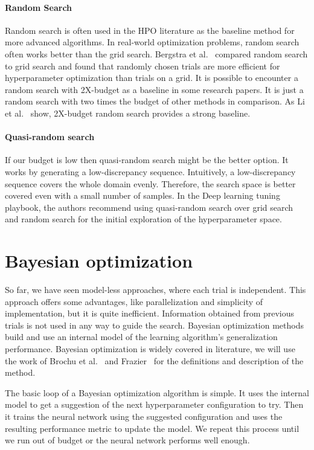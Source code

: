 \paragraph{Random Search} Random search is often used in the HPO literature as the baseline method for more advanced algorithms. In real-world optimization problems, random search often works better than the grid search. Bergstra et al.~\cite{bergstra2012random} compared random search to grid search and found that randomly chosen trials are more efficient for hyperparameter optimization than trials on a grid. It is possible to encounter a random search with 2X-budget as a baseline in some research papers. It is just a random search with two times the budget of other methods in comparison. As Li et al.~\cite{li2018hyperband} show, 2X-budget random search provides a strong baseline.

\paragraph{Quasi-random search} If our budget is low then quasi-random search might be the better option. It works by generating a low-discrepancy sequence. Intuitively, a low-discrepancy sequence covers the whole domain evenly. Therefore, the search space is better covered even with a small number of samples. In the Deep learning tuning playbook, the authors recommend using quasi-random search over grid search and random search for the initial exploration of the hyperparameter space.



\section{Bayesian optimization}
So far, we have seen model-less approaches, where each trial is independent. This approach offers some advantages, like parallelization and simplicity of implementation, but it is quite inefficient. Information obtained from previous trials is not used in any way to guide the search. Bayesian optimization methods build and use an internal model of the learning algorithm's generalization performance. Bayesian optimization is widely covered in literature, we will use the work of Brochu et al.~\cite{brochu2010tutorial} and Frazier~\cite{frazier2018tutorial} for the definitions and description of the method.

The basic loop of a Bayesian optimization algorithm is simple. It uses the internal model to get a suggestion of the next hyperparameter configuration to try. Then it trains the neural network using the suggested configuration and uses the resulting performance metric to update the model. We repeat this process until we run out of budget or the neural network performs well enough. %

